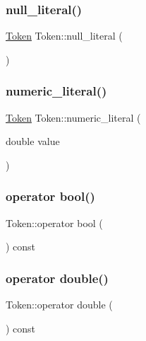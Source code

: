 \subsubsection{\texorpdfstring{null\+\_\+literal()}{null\_literal()}}
{\footnotesize\ttfamily \hyperlink{class_token}{Token} Token\+::null\+\_\+literal (\begin{DoxyParamCaption}{ }\end{DoxyParamCaption})\hspace{0.3cm}{\ttfamily [static]}}

\mbox{\label{class_token_ab457a4f53eef0512a5fd2ea0206e3c1e}} 
\subsubsection{\texorpdfstring{numeric\+\_\+literal()}{numeric\_literal()}}
{\footnotesize\ttfamily \hyperlink{class_token}{Token} Token\+::numeric\+\_\+literal (\begin{DoxyParamCaption}\item[{double}]{value }\end{DoxyParamCaption})\hspace{0.3cm}{\ttfamily [static]}}

\mbox{\label{class_token_a34140d60656a12bbfcdfbcf85e985133}} 
\subsubsection{\texorpdfstring{operator bool()}{operator bool()}}
{\footnotesize\ttfamily Token\+::operator bool (\begin{DoxyParamCaption}{ }\end{DoxyParamCaption}) const}

\mbox{\label{class_token_a9d9ecf295a7bb23922db6ea5b9e97833}} 
\subsubsection{\texorpdfstring{operator double()}{operator double()}}
{\footnotesize\ttfamily Token\+::operator double (\begin{DoxyParamCaption}{ }\end{DoxyParamCaption}) const}

